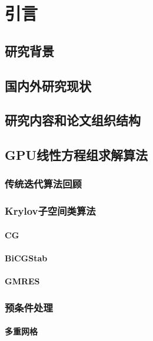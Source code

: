\documentclass[master,xetex]{thuthesis}
\begin{document}
\graphicspath{{figures/}}


\frontmatter


\tableofcontents

%


\mainmatter

\chapter{引言}
\section{研究背景}
\section{国内外研究现状}
\section{研究内容和论文组织结构}



\section{GPU线性方程组求解算法}
\subsection{传统迭代算法回顾}
\subsection{Krylov子空间类算法}
\subsubsection{CG}
\subsubsection{BiCGStab}
\subsubsection{GMRES}
\subsection{预条件处理}
\subsubsection{多重网格}
\end{document}
